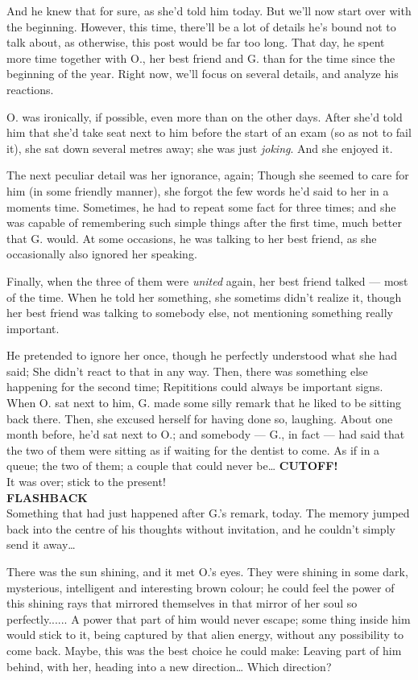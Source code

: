 And he knew that for sure, as she'd told him today. 
But we'll now start over with the beginning. 
However, this time, there'll be a lot of details he's bound not to talk about, as otherwise, this post would be far too long. 
That day, he spent more time together with O., her best friend and G. than for the time since the beginning of the year. 
Right now, we'll focus on several details, and analyze his reactions.

O. was ironically, if possible, even more than on the other days. After she'd told him that she'd take seat next to him before the start of an exam (so as not to fail it), she sat down several metres away; she was just \emph{joking}. 
And she enjoyed it.

The next peculiar detail was her ignorance, again; Though she seemed to care for him (in some friendly manner), she forgot the few words he'd said to her in a moments time. 
Sometimes, he had to repeat some fact for three times; and she was capable of remembering such simple things after the first time, much better that G. would. 
At some occasions, he was talking to her best friend, as she occasionally also ignored her speaking.

Finally, when the three of them were \emph{united} again, her best friend talked --- most of the time. When he told her something, she sometims didn't realize it, though her best friend was talking to somebody else, not mentioning something really important.

He pretended to ignore her once, though he perfectly understood what she had said; She didn't react to that in any way. 
Then, there was something else happening for the second time; Repititions could always be important signs. 
When O. sat next to him, G. made some silly remark that he liked to be sitting back there. Then, she excused herself for having done so, laughing. 
About one month before, he'd sat next to O.; and somebody --- G., in fact --- had said that the two of them were sitting as if waiting for the dentist to come. 
As if in a queue; the two of them; a couple that could never be\dots{}
\textbf{CUTOFF!}\\
It was over; stick to the present!\\
\textbf{FLASHBACK}\\
Something that had just happened after G.'s remark, today. 
The memory jumped back into the centre of his thoughts without invitation, and he couldn't simply send it away\dots{}

There was the sun shining, and it met O.'s eyes. 
They were shining in some dark, mysterious, intelligent and interesting brown colour; he could feel the power of this shining rays that mirrored themselves in that mirror of her soul so perfectly......
A power that part of him would never escape; some thing inside him would stick to it, being captured by that alien energy, without any possibility to come back. 
Maybe, this was the best choice he could make: Leaving part of him behind, with her, heading into a new direction\dots{}
Which direction?

